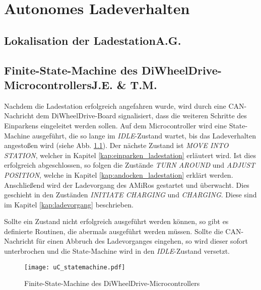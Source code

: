 \chapter{Autonomes Ladeverhalten} \label{kap:AutonomesLadeverhalten}

\section[Lokalisation der Ladestation]{Lokalisation der Ladestation\hfill {\normalsize A.G.}} %

\section[Finite-State-Machine des DiWheelDrive-Microcontrollers]{Finite-State-Machine des DiWheelDrive-Microcontrollers\hfill {\normalsize J.E. \& T.M.}} %

Nachdem die Ladestation erfolgreich angefahren wurde, wird durch eine CAN-Nachricht dem DiWheelDrive-Board signalisiert, dass die weiteren Schritte des Einparkens eingeleitet werden sollen.
Auf dem Microcontroller wird eine State-Machine ausgeführt, die so lange im \textit{IDLE}-Zustand wartet, bis das Ladeverhalten angestoßen wird (siehe Abb. \ref{fig:uC_statmachine}).
Der nächste Zustand ist \textit{MOVE INTO STATION}, welcher in Kapitel \ref{kap:einparken_ladestation} erläutert wird. Ist dies erfolgreich abgeschlossen, so folgen die Zustände \textit{TURN AROUND} und \textit{ADJUST POSITION}, welche in Kapitel \ref{kap:andocken_ladestation} erklärt werden. Anschließend wird der Ladevorgang des AMiRos gestartet und überwacht. Dies geschieht in den Zuständen \textit{INITIATE CHARGING} und \textit{CHARGING}. Diese sind im Kapitel \ref{kap:ladevorgang} beschrieben.

Sollte ein Zustand nicht erfolgreich ausgeführt werden können, so gibt es definierte Routinen, die abermals ausgeführt werden müssen. Sollte die CAN-Nachricht für einen Abbruch des Ladevorganges eingehen, so wird dieser sofort unterbrochen und die State-Machine wird in den \textit{IDLE}-Zustand versetzt.

\begin{figure}[H]
	\begin{center}
		\texttt{[image: uC\_statemachine.pdf]} 	
		\caption{Finite-State-Machine des DiWheelDrive-Microcontrollers}
		\label{fig:uC_statmachine}
	\end{center}
\end{figure}

